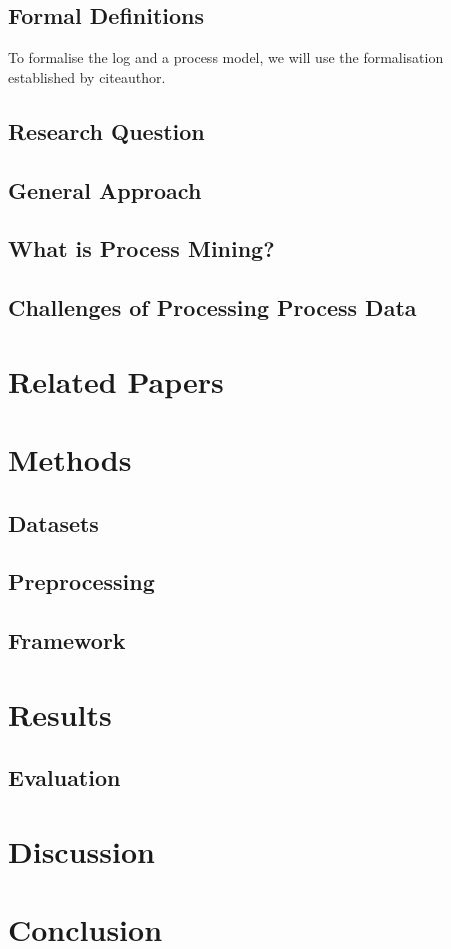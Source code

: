 \documentclass[12pt,a4paper]{report}
\begin{document}
\section{Formal Definitions}
To formalise the log and a process model, we will use the formalisation established by citeauthor\needscite.

\section{Research Question}

\section{General Approach}

\section{What is Process Mining?}

\section{Challenges of Processing Process Data}

\chapter{Related Papers}


\chapter{Methods}
\label{sec:methods}

\section{Datasets}
\label{sec:datasets}

\section{Preprocessing}
\label{sec:preprocessing}

\section{Framework}

\chapter{Results}
\label{sec:results}

\section{Evaluation}
\label{subsec:evaluation}


\chapter{Discussion}
\label{sec:dicussion}


\chapter{Conclusion}
\label{sec:conclusion}


\printbibliography

\appendix
\end{document}
